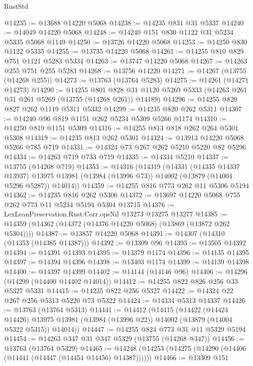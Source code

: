 \begin{lexlean}{RustStd}
\begin{coremodule}
@14235 := @13688 @14220 @5068
@14238 := @14235 @831 @31 @5337
@14240 := @14049 @14220 @5068
@14248 := @14240 @151 @830 @1122 @31 @5234 @5335 @5068 @1149
@14250 := @13726 @14220 @5068
@14253 := @14250 @830 @1122 @5335
@14255 := @13735 @14220 @5068
@14261 := @14255 @810 @829 @751 @1121 @5283 @5334
@14263 := @13747 @14220 @5068
@14267 := @14263 @255 @751 @255 @5283
@14268 := @13756 @14220
@14271 := @14267 (@13755 (@14268 @255))
@14273 := @13763 (@13764 @5283)
@14275 := @14261 (@14271 @14273)
@14290 := @14255
    @801
    @828
    @31
    @1120
    @5269
    @5333
    (@14263 @261 @31 @261 @5269 (@13755 (@14268 @261)) @14189)
@14296 := @14255 @820 @827 @262 @1119 @5311 @5332
@14299 := @14235 @820 @262 @5311
@14307 := @14240 @96 @819 @1151 @262 @5234 @5309 @5266 @1174
@14310 := @14250 @819 @1151 @5309
@14316 := @14255 @813 @818 @262 @264 @5301 @5308
@14319 := @14235 @813 @262 @5301
@14324 := @13913 @14220 @5068 @5266 @785 @719
@14331 := @14324 @73 @267 @262 @5210 @5220 @82 @5296
@14334 := @14263 @719 @733 @719
@14335 := @14334 @5210
@14337 := @13755 (@14268 @719)
@14353 := @14316
    (@14319
      (@14331
        (@14335 @14337 @13937)
        @13975
        @13981
        (@13984 (@13996 @73))
        @14002
        (@13879 (@14004 @5296 @5287))
        @14014))
@14359 := @14255 @816 @773 @262 @11 @5306 @5194
@14362 := @14235 @816 @262 @5306
@14372 := @13697 @14220 @5068 @755 @262 @773 @11 @5234 @5194 @5304 @13715
@14376 := LexLeanPreservation.Rust.Corr.opsNil @13273 @13275 @13277
@14385 := @14359 (@14362 (@14372 (@14376 @14220 @5068) (@13869 (@13872 @262 @5304))))
@14387 := @13857 @14220 @5068
@14391 := @14307 (@14310 (@14353 (@14385 @14387)))
@14392 := @13309 @96
@14393 := @13505 @14392
@14394 := @14391 @14393
@14395 := @13379 @1174
@14396 := @14135 @14395
@14397 := @14394 @14396
@14398 := @13403 @1174
@14399 := @14139 @14398
@14400 := @14397 @14399
@14402 := @14144 (@14146 @96)
@14406 := @14296 (@14299 (@14400 @14402 @14014))
@14412 := @14255 @822 @826 @256 @33 @5327 @5331
@14415 := @14235 @822 @256 @5327
@14422 := @14324 @22 @267 @256 @5313 @5220 @73 @5322
@14424 := @14334 @5313 @14337
@14426 := @13763 (@13764 @5313)
@14441 := @14412
    (@14415
      (@14422
        (@14424 @14426)
        @13975
        @13981
        (@13984 (@13996 @22))
        @14002
        (@13879 (@14004 @5322 @5315))
        @14014))
@14447 := @14255 @824 @773 @31 @11 @5329 @5194
@14454 := @14263 @347 @31 @347 @5329 (@13755 (@14268 @347))
@14456 := @13763 (@13764 @5329)
@14465 := @14248 (@14253 (@14275 (@14290 (@14406 (@14441 (@14447 (@14454 @14456) @14387))))))
@14466 := @13309 @151

\end{coremodule}
\end{lexlean}
